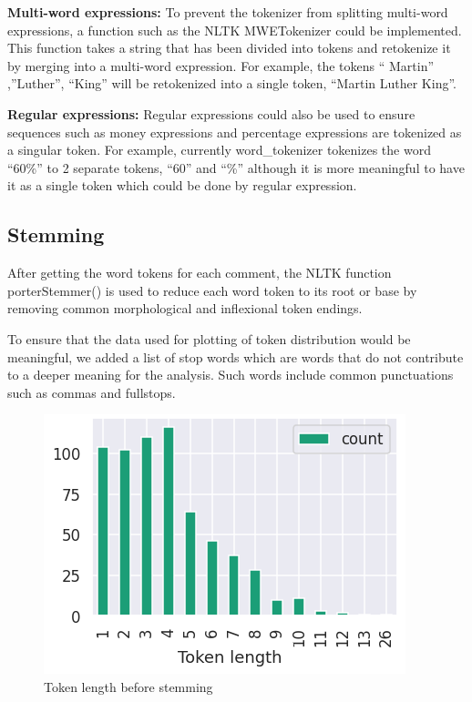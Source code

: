 \documentclass[sigconf,nonacm=true]{acmart}
\begin{document}
 {\bf Multi-word expressions:}
To prevent the tokenizer from splitting multi-word expressions, a function such as the NLTK MWETokenizer could be implemented. This function takes a string that has been divided into tokens and re\-tokenize it by merging into a multi-word expression. For example, the tokens “ Martin” ,”Luther”, “King” will be re\-tokenized into a single token, “Martin Luther King”. \smallskip

 {\bf Regular expressions:}
Regular expressions could also be used to ensure sequences such as money expressions and percentage expressions are tokenized as a singular token. For example, currently word\_tokenizer tokenizes the word “60\%” to 2 separate tokens, “60” and “\%” although it is more meaningful to have it as a single token which could be done by regular expression. 



\subsection{Stemming}
After getting the word tokens for each comment, the NLTK function porterStemmer() is used to reduce each word token to its root or base by removing common morphological and inflexional token endings.

To ensure that the data used for plotting of token distribution would be meaningful, we added a list of stop words which are words that do not contribute to a deeper meaning for the analysis. Such words include common punctuations such as commas and fullstops. \linebreak
\begin{figure}
	\centering
	\includegraphics[scale=0.55]{ss1.png}
	\caption{Token length before stemming}
\end{figure}
\end{document}
